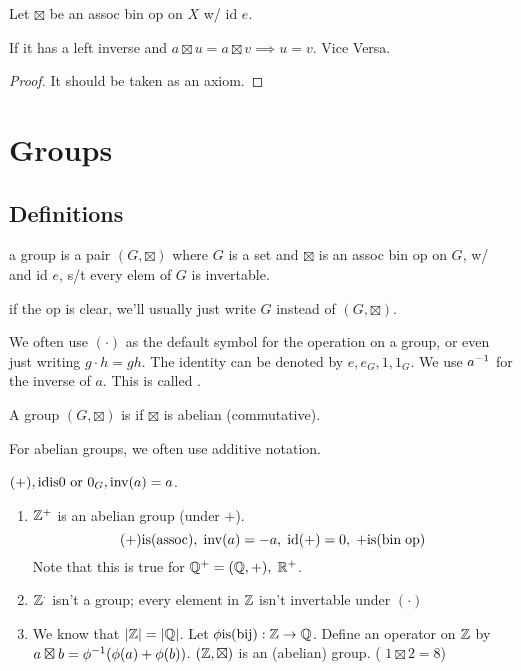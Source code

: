 \documentclass[12pt]{article}
\newcommand{\gop}[0]{\boxtimes}
\begin{document}


\bbox
\begin{lem}\label{lem:cancel_prop}
  Let \(\gop\) be an assoc bin op on \(X\) w/ id \(e\). 

  If it has a left inverse and \(a\gop u=a\gop v\implies u=v\).
  Vice Versa.
\end{lem}
\ebox

\bboxproof
\begin{proof}
  It should be taken as an axiom.
\end{proof}
\ebox

\section{Groups}
\subsection{Definitions}
\bbox
\begin{defn}[Group]\label{defn:group}
  a group is a pair \((G,\gop)\) where \(G\) is a set and \(\gop\)
  is an assoc bin op on \(G\), w/ and id \(e\), s/t every elem of \(G\) is 
  invertable.
\end{defn}
\ebox

\bbox
\begin{nota}\label{nota:mul_nota}
  if the op is clear, we'll usually just write \(G\) instead of \((G,\gop)\).

  We often use \((\cdot)\) as the default symbol for the operation on a group,
  or even just writing \(g\cdot h=gh\). The identity can be denoted by
  \(e,e_G,1,1_G\). We use \(a^{-1}\) for the inverse of \(a\). This is called
  .
\end{nota}
\ebox

\bbox
\begin{defn}\label{defn:abel_group}
  A group \((G,\gop)\) is  if \(\gop\) is abelian (commutative).
\end{defn}
\ebox

For abelian groups, we often use additive notation.

\((+),\mathrm{id}\mathrm{is} 0 \text{ or } 0_G, \mathrm{inv}(a)=a\).

\bboxex
\begin{enumerate}
  \item \(\mathbb Z^+\) is an abelian group (under \(+\)).
    \[(+)\mathrm{is}(\mathrm{assoc}),\;\mathrm{inv}(a)=-a,\;\mathrm{id}(+)=0,\;+\mathrm{is}(\mathrm{bin\;op})\]
    Note that this is true for \(\mathbb Q^+=(\mathbb Q,+),\;\mathbb R^+\).
  \item \(\mathbb Z^\cdot\) isn't a group; every element in \(\mathbb Z\) isn't invertable under
    \((\cdot)\)
  \item We know that \(|\mathbb Z|=|\mathbb Q|\). Let \(\phi\mathrm{is}(\mathrm{bij}):\mathbb Z\to\mathbb Q\).
    Define an operator on \(\mathbb Z\) by \(a\gop b=\inv \phi(\phi(a)+\phi(b))\).
    \((\Z,\gop)\) is an (abelian) group. ( \(1\gop 2=8\))
\end{enumerate}
\ebox
\end{document}
